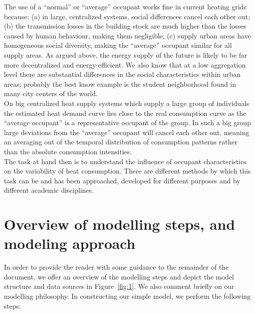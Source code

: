 \documentclass[11pt]{IJM-article}
\begin{document}
The use of a ``normal'' or ``average'' occupant works fine in current heating
grids because: (a) in large, centralized systems, social differences cancel
each other out; (b) the transmission losses in the building stock are much
higher than the losses caused by human behaviour, making them negligible; (c)
supply urban areas have homogeneous social diversity, making the ``average''
occupant similar for all supply areas. As argued above, the energy supply of
the future is likely to be far more decentralized  and
energy-efficient.  We also know that at a low aggregation level there are
substantial differences in the social characteristics within urban areas;
probably the best know example is the student neighborhood found in many city
centers of the world.\\

On big centralized heat supply systems which supply a large group of
individuals the estimated heat demand curve lies close to the real consumption
curve as the ``average occupant'' is a representative occupant of the group. In
such a big group large deviations from the ``average'' occupant will cancel
each other out, meaning an averaging out of the temporal distribution of
consumption patterns rather than the absolute consumption intensities.\\

The task at hand then is to understand the influence of occupant
characteristics on the variability of heat consumption. There are different
methods by which this task can be and has been approached, developed for
different purposes and by different academic disciplines.

\section{Overview of modelling steps, and modeling approach}
\label{sec:2}

In order to provide the reader with some guidance to the remainder of the
document, we offer an overview of the modelling steps and depict the model
structure and data sources in Figure~\ref{fig:1}.  We also comment briefly on
our modelling philosophy. In constructing our simple model, we perform the
following steps:\\
\end{document}
